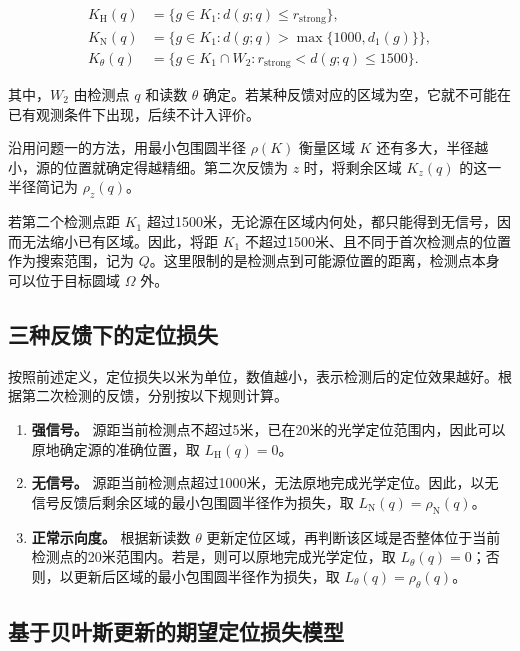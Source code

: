 \begin{equation}
\begin{aligned}
K_{\mathrm H}(q)&=\{g\in K_1:d(g;q)\le r_{\mathrm{strong}}\},\\
K_{\mathrm N}(q)&=\{g\in K_1:d(g;q)>\max\{1000,d_1(g)\}\},\\
K_\theta(q)&=\{g\in K_1\cap W_2:r_{\mathrm{strong}}<d(g;q)\le1500\}.
\end{aligned}
\label{eq:q2-pair-regions}
\end{equation}

其中，\(W_2\) 由检测点 \(q\) 和读数 \(\theta\) 确定。若某种反馈对应的区域为空，它就不可能在已有观测条件下出现，后续不计入评价。

沿用问题一的方法，用最小包围圆半径 \(\rho(K)\) 衡量区域 \(K\) 还有多大，半径越小，源的位置就确定得越精细。第二次反馈为 \(z\) 时，将剩余区域 \(K_z(q)\) 的这一半径简记为 \(\rho_z(q)\)。

若第二个检测点距 \(K_1\) 超过1500米，无论源在区域内何处，都只能得到无信号，因而无法缩小已有区域。因此，将距 \(K_1\) 不超过1500米、且不同于首次检测点的位置作为搜索范围，记为 \(Q\)。这里限制的是检测点到可能源位置的距离，检测点本身可以位于目标圆域 \(\Omega\) 外。

\subsection{三种反馈下的定位损失}

按照前述定义，定位损失以米为单位，数值越小，表示检测后的定位效果越好。根据第二次检测的反馈，分别按以下规则计算。

\begin{enumerate}[label=(\arabic*),leftmargin=2.2em]
  \item \textbf{强信号。} 源距当前检测点不超过5米，已在20米的光学定位范围内，因此可以原地确定源的准确位置，取 \(L_{\mathrm H}(q)=0\)。
  \item \textbf{无信号。} 源距当前检测点超过1000米，无法原地完成光学定位。因此，以无信号反馈后剩余区域的最小包围圆半径作为损失，取 \(L_{\mathrm N}(q)=\rho_{\mathrm N}(q)\)。
  \item \textbf{正常示向度。} 根据新读数 \(\theta\) 更新定位区域，再判断该区域是否整体位于当前检测点的20米范围内。若是，则可以原地完成光学定位，取 \(L_\theta(q)=0\)；否则，以更新后区域的最小包围圆半径作为损失，取 \(L_\theta(q)=\rho_\theta(q)\)。
\end{enumerate}

\subsection{基于贝叶斯更新的期望定位损失模型}


